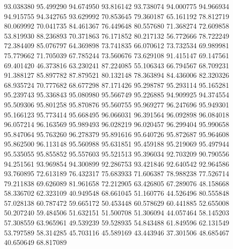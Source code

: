93.038380
95.499290
94.674950
93.816142
93.738074
94.000775
94.966934
94.915755
94.342765
93.629992
70.853645
79.360187
65.161192
78.812719
80.069992
70.041735
84.461367
76.449648
80.557680
71.368274
72.609858
53.819930
88.236893
70.371863
76.171852
80.217132
56.772666
78.722249
72.384409
85.076797
64.369898
73.741835
66.070612
73.732534
69.989981
75.779662
71.705039
67.785244
73.560676
73.629108
91.415147
69.147561
69.401420
46.373816
63.230241
87.224085
55.106343
66.794567
68.709231
91.388127
85.897782
87.879521
80.132148
78.363894
84.436006
82.320326
68.935724
70.777682
68.677298
87.171426
95.298787
95.293114
95.165281
95.239743
95.336843
95.080980
95.566749
95.226885
94.909925
94.374554
95.509306
95.801258
95.870876
95.560755
95.969277
96.247696
95.949301
95.166123
95.773414
95.668495
96.066031
96.391564
96.092898
96.084018
96.057214
96.163569
95.989493
96.028219
96.020457
96.299404
95.990658
95.847064
95.763260
96.278379
95.891616
95.640726
95.872687
95.964608
95.862500
96.113148
95.560988
95.631851
95.459188
95.219069
95.497944
95.535055
95.855852
95.557603
95.521513
95.396034
92.703209
90.790556
94.251561
93.969854
94.300899
92.286753
93.421846
92.640542
92.964586
93.760895
72.613189
76.432317
75.683933
71.606387
78.988238
77.526714
79.211838
69.626089
81.961658
72.212905
63.426805
67.289076
48.158668
58.336702
62.323109
40.949548
68.661045
51.160776
44.526496
80.555848
57.028138
60.787472
59.665172
50.453448
60.578629
60.441885
52.655008
50.207240
59.484506
51.632151
51.500708
51.306094
44.057464
58.145203
57.308559
63.965961
49.539239
59.528935
54.843488
61.849596
62.131549
53.797589
58.314285
45.703116
45.589169
43.443946
37.301506
48.685467
40.650649
68.817089
